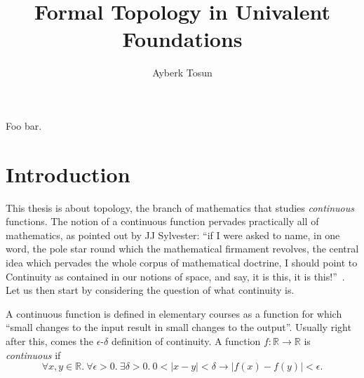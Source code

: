 

\title{Formal Topology in Univalent Foundations}
\author{Ayberk Tosun}
\newcommand{\authorname}{Ayberk Tosun}





\newcommand{\reals}{\mathbb{R}}



\maketitlepage{}

\begin{abstract}
  \lipsum[1-2]{}
\end{abstract}

\begin{acknowledgements}
  Foo bar.
\end{acknowledgements}

\makelists{}

\chapter{Introduction}

This thesis is about topology, the branch of mathematics that studies \emph{continuous}
functions. The notion of a continuous function pervades practically all of mathematics, as
pointed out by JJ Sylvester: ``if I were asked to name, in one word, the pole star round
which the mathematical firmament revolves, the central idea which pervades the whole
corpus of mathematical doctrine, I should point to Continuity as contained in our notions
of space, and say, it is this, it is this!''~\cite[pg. 27]{armstrong_basic_2011}. Let us
then start by considering the question of what continuity is.

A continuous function is defined in elementary courses as a function for which ``small
changes to the input result in small changes to the output''. Usually right after this,
comes the $\epsilon$-$\delta$ definition of continuity. A function $f : \reals{} \rightarrow \reals{}$ is
\emph{continuous} if
\begin{equation*}
  \forall x, y \in \reals{}.\ \forall \epsilon > 0.\ \exists \delta > 0.\ 0 < | x - y | < \delta \rightarrow | f(x) - f(y) | < \epsilon.
\end{equation*}

